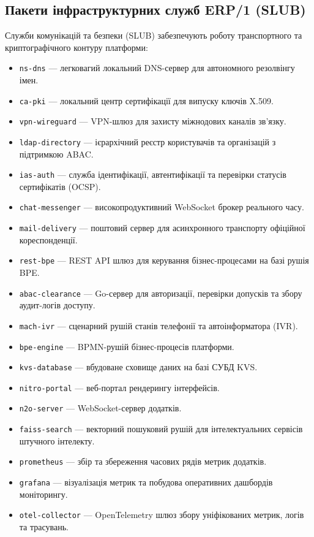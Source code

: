 \documentclass{article}
\begin{document}
\subsection{Пакети інфраструктурних служб ERP/1 (SLUB)}
Служби комунікацій та безпеки (SLUB) забезпечують роботу транспортного та криптографічного контуру платформи:
\begin{itemize}
    \item \texttt{ns-dns} --- легковагий локальний DNS-сервер для автономного резолвінгу імен.
    \item \texttt{ca-pki} --- локальний центр сертифікації для випуску ключів X.509.
    \item \texttt{vpn-wireguard} --- VPN-шлюз для захисту міжнодових каналів зв'язку.
    \item \texttt{ldap-directory} --- ієрархічний реєстр користувачів та організацій з підтримкою ABAC.
    \item \texttt{ias-auth} --- служба ідентифікації, автентифікації та перевірки статусів сертифікатів (OCSP).
    \item \texttt{chat-messenger} --- високопродуктивний WebSocket брокер реального часу.
    \item \texttt{mail-delivery} --- поштовий сервер для асинхронного транспорту офіційної кореспонденції.
    \item \texttt{rest-bpe} --- REST API шлюз для керування бізнес-процесами на базі рушія BPE.
    \item \texttt{abac-clearance} --- Go-сервер для авторизації, перевірки допусків та збору аудит-логів доступу.
    \item \texttt{mach-ivr} --- сценарний рушій станів телефонії та автоінформатора (IVR).
    \item \texttt{bpe-engine} --- BPMN-рушій бізнес-процесів платформи.
    \item \texttt{kvs-database} --- вбудоване сховище даних на базі СУБД KVS.
    \item \texttt{nitro-portal} --- веб-портал рендерингу інтерфейсів.
    \item \texttt{n2o-server} --- WebSocket-сервер додатків.
    \item \texttt{faiss-search} --- векторний пошуковий рушій для інтелектуальних сервісів штучного інтелекту.
    \item \texttt{prometheus} --- збір та збереження часових рядів метрик додатків.
    \item \texttt{grafana} --- візуалізація метрик та побудова оперативних дашбордів моніторингу.
    \item \texttt{otel-collector} --- OpenTelemetry шлюз збору уніфікованих метрик, логів та трасувань.
\end{itemize}
\end{document}
